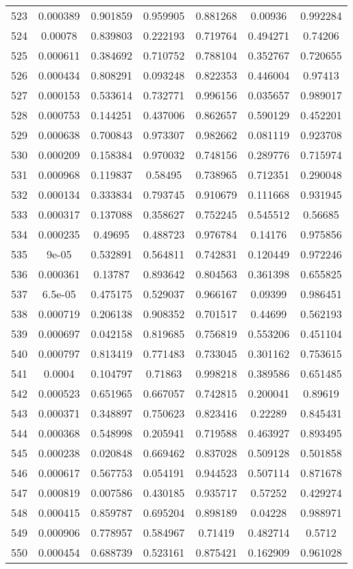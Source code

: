 \begin{table}
\begin{tabular}{c|c|c|c|c|c|c}
523 & 0.000389 & 0.901859 & 0.959905 & 0.881268 & 0.00936 & 0.992284\\
524 & 0.00078 & 0.839803 & 0.222193 & 0.719764 & 0.494271 & 0.74206\\
525 & 0.000611 & 0.384692 & 0.710752 & 0.788104 & 0.352767 & 0.720655\\
526 & 0.000434 & 0.808291 & 0.093248 & 0.822353 & 0.446004 & 0.97413\\
527 & 0.000153 & 0.533614 & 0.732771 & 0.996156 & 0.035657 & 0.989017\\
528 & 0.000753 & 0.144251 & 0.437006 & 0.862657 & 0.590129 & 0.452201\\
529 & 0.000638 & 0.700843 & 0.973307 & 0.982662 & 0.081119 & 0.923708\\
530 & 0.000209 & 0.158384 & 0.970032 & 0.748156 & 0.289776 & 0.715974\\
531 & 0.000968 & 0.119837 & 0.58495 & 0.738965 & 0.712351 & 0.290048\\
532 & 0.000134 & 0.333834 & 0.793745 & 0.910679 & 0.111668 & 0.931945\\
533 & 0.000317 & 0.137088 & 0.358627 & 0.752245 & 0.545512 & 0.56685\\
534 & 0.000235 & 0.49695 & 0.488723 & 0.976784 & 0.14176 & 0.975856\\
535 & 9e-05 & 0.532891 & 0.564811 & 0.742831 & 0.120449 & 0.972246\\
536 & 0.000361 & 0.13787 & 0.893642 & 0.804563 & 0.361398 & 0.655825\\
537 & 6.5e-05 & 0.475175 & 0.529037 & 0.966167 & 0.09399 & 0.986451\\
538 & 0.000719 & 0.206138 & 0.908352 & 0.701517 & 0.44699 & 0.562193\\
539 & 0.000697 & 0.042158 & 0.819685 & 0.756819 & 0.553206 & 0.451104\\
540 & 0.000797 & 0.813419 & 0.771483 & 0.733045 & 0.301162 & 0.753615\\
541 & 0.0004 & 0.104797 & 0.71863 & 0.998218 & 0.389586 & 0.651485\\
542 & 0.000523 & 0.651965 & 0.667057 & 0.742815 & 0.200041 & 0.89619\\
543 & 0.000371 & 0.348897 & 0.750623 & 0.823416 & 0.22289 & 0.845431\\
544 & 0.000368 & 0.548998 & 0.205941 & 0.719588 & 0.463927 & 0.893495\\
545 & 0.000238 & 0.020848 & 0.669462 & 0.837028 & 0.509128 & 0.501858\\
546 & 0.000617 & 0.567753 & 0.054191 & 0.944523 & 0.507114 & 0.871678\\
547 & 0.000819 & 0.007586 & 0.430185 & 0.935717 & 0.57252 & 0.429274\\
548 & 0.000415 & 0.859787 & 0.695204 & 0.898189 & 0.04228 & 0.988971\\
549 & 0.000906 & 0.778957 & 0.584967 & 0.71419 & 0.482714 & 0.5712\\
550 & 0.000454 & 0.688739 & 0.523161 & 0.875421 & 0.162909 & 0.961028\\
\end{tabular}
\end{table}

